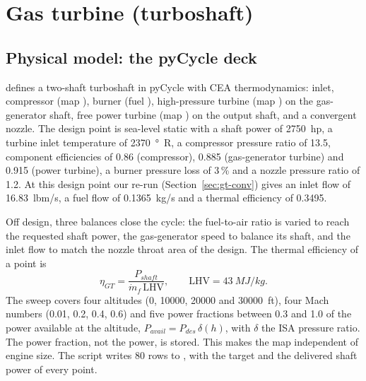 \documentclass[a4paper,11pt]{article}
\newcommand{\etagt}{\eta_{GT}}
\begin{document}
\section{Gas turbine (turboshaft)}\label{sec:gt}

\subsection{Physical model: the pyCycle deck}\label{sec:gt-deck}
 defines a two-shaft turboshaft in pyCycle with CEA
thermodynamics: inlet, compressor (map ), burner (fuel ), high-pressure
turbine (map ) on the gas-generator shaft, free power turbine (map )
on the output shaft, and a convergent nozzle. The design point is sea-level static with a shaft
power of \SI{2750}{hp}, a turbine inlet temperature of \SI{2370}{\degree R}, a compressor pressure
ratio of 13.5, component efficiencies of 0.86 (compressor), 0.885 (gas-generator turbine) and
0.915 (power turbine), a burner pressure loss of 3\,\% and a nozzle pressure ratio of 1.2. At this
design point our re-run (Section~\ref{sec:gt-conv}) gives an inlet flow of
\SI{16.83}{lbm/s}, a fuel flow of \SI{0.1365}{kg/s} and a thermal efficiency of 0.3495.

Off design, three balances close the cycle: the fuel-to-air ratio is varied to reach the
requested shaft power, the gas-generator speed to balance its shaft, and the inlet flow to
match the nozzle throat area of the design. The thermal efficiency of a point is
\begin{equation}
  \etagt = \frac{P_{shaft}}{\dot m_f\,\mathrm{LHV}}, \qquad \mathrm{LHV} = \SI{43}{MJ/kg}.
  \label{eq:etagt}
\end{equation}
The sweep covers four altitudes (0, \num{10000}, \num{20000} and \SI{30000}{ft}), four Mach
numbers (0.01, 0.2, 0.4, 0.6) and five power fractions between 0.3 and 1.0 of the power available
at the altitude, $P_{avail} = P_{des}\,\delta(h)$, with $\delta$ the ISA pressure ratio. The power
fraction, not the power, is stored. This makes the map independent of engine size. The script
writes 80 rows to , with the target and the delivered shaft power of
every point.
\end{document}
